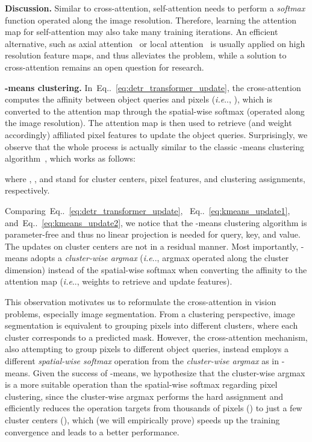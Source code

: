 \documentclass[runningheads]{llncs}
\makeatletter
\DeclareRobustCommand\onedot{\futurelet\@let@token\@onedot}
\def\@onedot{\ifx\@let@token.\else.\null\fi\xspace}
\def\ie{\emph{i.e}\onedot} \def\Ie{\emph{I.e}\onedot}
\newcommand{\equref}[1]{Eq\onedot~\eqref{#1}}
\makeatother
\begin{document}
{\bf Discussion.}\quad
Similar to cross-attention, self-attention needs to perform a \textit{softmax} function operated along the image resolution. Therefore, learning the attention map for self-attention may also take many training iterations.
An efficient alternative, such as axial attention~\cite{wang2020axial} or local attention~\cite{liu2021swin} is usually applied on high resolution feature maps, and thus alleviates the problem, while a solution to cross-attention remains an open question for research.


{\bf -means clustering.}\quad
In~\equref{eq:detr_transformer_update}, the cross-attention computes the affinity between object queries and pixels (\ie, ), which is converted to the attention map through the spatial-wise softmax (operated along the image resolution).
The attention map is then used to retrieve (and weight accordingly) affiliated pixel features to update the object queries. Surprisingly, we observe that the whole process is actually similar to the classic -means clustering algorithm~\cite{lloyd1982least}, which works as follows:

where ,  , and  stand for cluster centers, pixel features, and clustering assignments, respectively.

Comparing~\equref{eq:detr_transformer_update}, ~\equref{eq:kmeans_update1}, and~\equref{eq:kmeans_update2}, we notice that the -means clustering algorithm is parameter-free and thus no linear projection is needed for query, key, and value.
The updates on cluster centers are not in a residual manner.
Most importantly, -means adopts a \textit{cluster-wise argmax} (\ie, argmax operated along the cluster dimension) instead of the spatial-wise softmax when converting the affinity to the attention map (\ie, weights to retrieve and update features).

This observation motivates us to reformulate the cross-attention in vision problems, especially image segmentation.
From a clustering perspective, image segmentation is equivalent to grouping pixels into different clusters, where each cluster corresponds to a predicted mask.
However, the cross-attention mechanism, also attempting to group pixels to different object queries, instead employs a different \textit{spatial-wise softmax} operation from the \textit{cluster-wise argmax} as in -means.
Given the success of -means, we hypothesize that the cluster-wise argmax is a more suitable operation than the spatial-wise softmax regarding pixel clustering, since the cluster-wise argmax performs the hard assignment and efficiently reduces the operation targets from thousands of pixels () to just a few cluster centers (), which (we will empirically prove) speeds up the training convergence and leads to a better performance.
\end{document}
